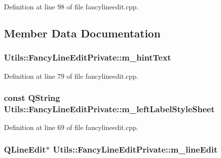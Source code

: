 Definition at line 98 of file fancylineedit.\-cpp.



\subsection{Member Data Documentation}
\hypertarget{class_utils_1_1_fancy_line_edit_private_a9c00e4643180c89143ef729c7704e8e7}{
\subsubsection[{m\-\_\-hint\-Text}]{ Utils\-::\-Fancy\-Line\-Edit\-Private\-::m\-\_\-hint\-Text}}\label{class_utils_1_1_fancy_line_edit_private_a9c00e4643180c89143ef729c7704e8e7}


Definition at line 79 of file fancylineedit.\-cpp.

\hypertarget{class_utils_1_1_fancy_line_edit_private_ac6b25312f607b9026eb121613299c779}{
\subsubsection[{m\-\_\-left\-Label\-Style\-Sheet}]{\setlength{\rightskip}{0pt plus 5cm}const {\bf Q\-String} Utils\-::\-Fancy\-Line\-Edit\-Private\-::m\-\_\-left\-Label\-Style\-Sheet}}\label{class_utils_1_1_fancy_line_edit_private_ac6b25312f607b9026eb121613299c779}


Definition at line 69 of file fancylineedit.\-cpp.

\hypertarget{class_utils_1_1_fancy_line_edit_private_aa5c668f49cf8d8e523dd5aa4a8f08e3d}{
\subsubsection[{m\-\_\-line\-Edit}]{\setlength{\rightskip}{0pt plus 5cm}Q\-Line\-Edit$\ast$ Utils\-::\-Fancy\-Line\-Edit\-Private\-::m\-\_\-line\-Edit}}\label{class_utils_1_1_fancy_line_edit_private_aa5c668f49cf8d8e523dd5aa4a8f08e3d}


